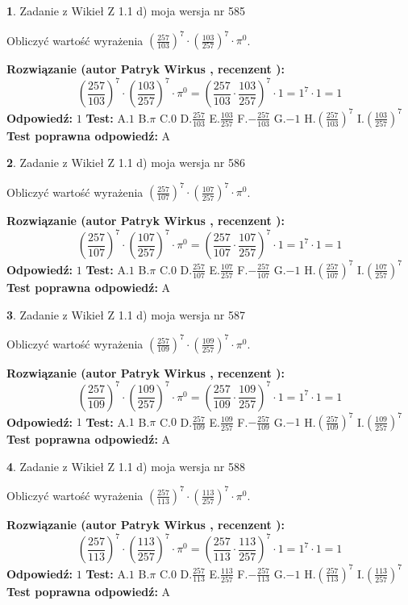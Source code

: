 \documentclass[12pt, a4paper]{article}
\theoremstyle{definition} %
\newtheorem{zad}{}
\newcommand{\zadStart}[1]{\begin{zad}#1\newline}
\newcommand{\zadStop}{\end{zad}}
\newcommand{\rozwStart}[2]{\noindent \textbf{Rozwiązanie (autor #1 , recenzent #2): }\newline}
\newcommand{\rozwStop}{\newline}
\newcommand{\odpStart}{\noindent \textbf{Odpowiedź:}\newline}
\newcommand{\odpStop}{\newline}
\newcommand{\testStart}{\noindent \textbf{Test:}\newline}
\newcommand{\testStop}{\newline}
\newcommand{\kluczStart}{\noindent \textbf{Test poprawna odpowiedź:}\newline}
\newcommand{\kluczStop}{\newline}
\begin{document}
\zadStart{Zadanie z Wikieł Z 1.1 d) moja wersja nr 585}

Obliczyć wartość wyrażenia $(\frac{257}{103})^{7} \cdot (\frac{103}{257})^{7} \cdot \pi^{0}$.
\zadStop
\rozwStart{Patryk Wirkus}{}
$$(\frac{257}{103})^{7} \cdot (\frac{103}{257})^{7} \cdot \pi^{0} = (\frac{257}{103} \cdot \frac{103}{257})^{7} \cdot 1 = 1^{7} \cdot 1 = 1$$
\rozwStop
\odpStart
$1$
\odpStop
\testStart
A.$1$ B.$\pi$ C.$0$ D.$\frac{257}{103}$ E.$\frac{103}{257}$
F.$-\frac{257}{103}$ G.$-1$
H.$(\frac{257}{103})^{7}$
I.$(\frac{103}{257})^{7}$
\testStop
\kluczStart
A
\kluczStop



\zadStart{Zadanie z Wikieł Z 1.1 d) moja wersja nr 586}

Obliczyć wartość wyrażenia $(\frac{257}{107})^{7} \cdot (\frac{107}{257})^{7} \cdot \pi^{0}$.
\zadStop
\rozwStart{Patryk Wirkus}{}
$$(\frac{257}{107})^{7} \cdot (\frac{107}{257})^{7} \cdot \pi^{0} = (\frac{257}{107} \cdot \frac{107}{257})^{7} \cdot 1 = 1^{7} \cdot 1 = 1$$
\rozwStop
\odpStart
$1$
\odpStop
\testStart
A.$1$ B.$\pi$ C.$0$ D.$\frac{257}{107}$ E.$\frac{107}{257}$
F.$-\frac{257}{107}$ G.$-1$
H.$(\frac{257}{107})^{7}$
I.$(\frac{107}{257})^{7}$
\testStop
\kluczStart
A
\kluczStop



\zadStart{Zadanie z Wikieł Z 1.1 d) moja wersja nr 587}

Obliczyć wartość wyrażenia $(\frac{257}{109})^{7} \cdot (\frac{109}{257})^{7} \cdot \pi^{0}$.
\zadStop
\rozwStart{Patryk Wirkus}{}
$$(\frac{257}{109})^{7} \cdot (\frac{109}{257})^{7} \cdot \pi^{0} = (\frac{257}{109} \cdot \frac{109}{257})^{7} \cdot 1 = 1^{7} \cdot 1 = 1$$
\rozwStop
\odpStart
$1$
\odpStop
\testStart
A.$1$ B.$\pi$ C.$0$ D.$\frac{257}{109}$ E.$\frac{109}{257}$
F.$-\frac{257}{109}$ G.$-1$
H.$(\frac{257}{109})^{7}$
I.$(\frac{109}{257})^{7}$
\testStop
\kluczStart
A
\kluczStop



\zadStart{Zadanie z Wikieł Z 1.1 d) moja wersja nr 588}

Obliczyć wartość wyrażenia $(\frac{257}{113})^{7} \cdot (\frac{113}{257})^{7} \cdot \pi^{0}$.
\zadStop
\rozwStart{Patryk Wirkus}{}
$$(\frac{257}{113})^{7} \cdot (\frac{113}{257})^{7} \cdot \pi^{0} = (\frac{257}{113} \cdot \frac{113}{257})^{7} \cdot 1 = 1^{7} \cdot 1 = 1$$
\rozwStop
\odpStart
$1$
\odpStop
\testStart
A.$1$ B.$\pi$ C.$0$ D.$\frac{257}{113}$ E.$\frac{113}{257}$
F.$-\frac{257}{113}$ G.$-1$
H.$(\frac{257}{113})^{7}$
I.$(\frac{113}{257})^{7}$
\testStop
\kluczStart
A
\kluczStop
\end{document}
